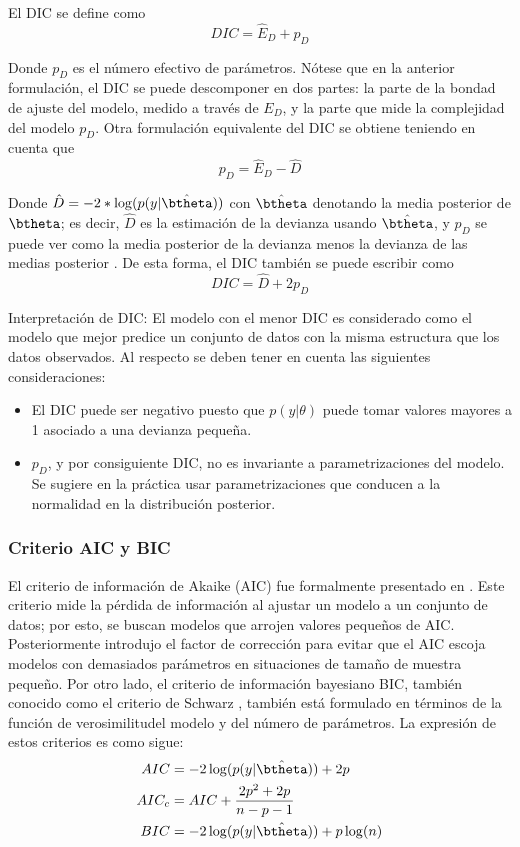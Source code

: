 El DIC se define como
\begin{equation*}
DIC=\hat{E}_D+p_D
\end{equation*}

Donde $p_D$ es el número efectivo de parámetros. Nótese que en la anterior formulación, el DIC se puede descomponer en dos partes: la parte de la bondad de ajuste del modelo, medido a través de $E_D$,  y la parte que mide la complejidad del modelo $p_D$. Otra formulación equivalente del DIC se obtiene teniendo en cuenta que
\begin{equation*}
p_D=\hat{E}_D - \hat{D}
\end{equation*}

Donde $\hat{D}=-2*\log(p(y|\hat{\btheta}))$ con $\hat{\btheta}$ denotando la media posterior de $\btheta$; es decir, $\hat{D}$ es la estimación de la devianza usando $\hat{\btheta}$, y $p_D$ se puede ver como la media posterior de la devianza menos la devianza de las medias posterior \cite{Spiegel}. De esta forma, el DIC también se puede escribir como
\begin{equation*}
DIC=\hat{D}+2p_D
\end{equation*}

Interpretación de DIC: El modelo con el menor DIC es considerado como el modelo que mejor predice un conjunto de datos con la misma estructura que los datos observados. Al respecto se deben tener en cuenta las siguientes consideraciones:

\begin{itemize}
  \item El DIC puede ser negativo puesto que $p(y|\theta)$ puede tomar valores mayores a 1 asociado a una devianza pequeña.
  \item $p_D$, y por consiguiente DIC, no es invariante a parametrizaciones del modelo. Se sugiere en la práctica usar parametrizaciones que conducen a la normalidad en la distribución posterior.
\end{itemize}

\subsubsection*{Criterio AIC y BIC}

El criterio de información de Akaike (AIC) fue formalmente presentado en . Este criterio mide la pérdida de información al ajustar un modelo a un conjunto de datos; por esto, se buscan modelos que arrojen valores pequeños de AIC. Posteriormente  introdujo el factor de corrección para evitar que el AIC escoja modelos con demasiados parámetros en situaciones de tamaño de muestra pequeño. Por otro lado, el criterio de información bayesiano BIC, también conocido como el criterio de Schwarz \cite{Schwarz}, también está formulado en términos de la función de verosimilitudel modelo y del número de parámetros. La expresión de estos criterios es como sigue:
\begin{align*}
AIC&=-2\log(p(y|\hat{\btheta}))+2p\\
AIC_c&=AIC+\frac{2p^2+2p}{n-p-1}\\
BIC&=-2\log(p(y|\hat{\btheta}))+p\log(n)
\end{align*}

